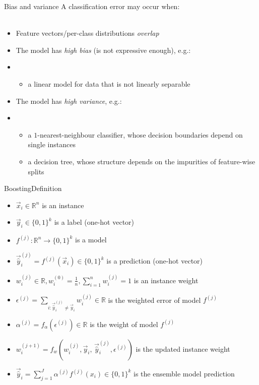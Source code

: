 \documentclass[10pt]{beamer}
\begin{document}
\begin{frame}{Bias and variance}
  A classification error may occur when:
  \\~\
  \begin{itemize}
    \item Feature vectors/per-class distributions \emph{overlap}
    \item The model has \emph{high bias} (is not expressive enough), e.g.:
    \item[]
          \begin{itemize}
            \item a linear model for data that is not linearly separable
          \end{itemize}
    \item The model has \emph{high variance}, e.g.:
    \item[]
          \begin{itemize}
            \item a $1$-nearest-neighbour classifier, whose decision boundaries
                  depend on single instances
            \item a decision tree, whose structure depends on the impurities of
                  feature-wise splits
          \end{itemize}
  \end{itemize}
\end{frame}

\begin{frame}{Boosting}{Definition}
  \begin{itemize}
    \item $\vec{x}_i \in \mathbb{R}^n$ is an instance
    \item $\vec{y}_i \in \{0,1\}^k$ is a label (one-hot vector)
    \item $f^{(j)} : \mathbb{R}^n \to \{0,1\}^k$ is a model
    \item $\vec{\hat{y}}_i^{(j)} = f^{(j)}(\vec{x}_i) \in \{0,1\}^k$ is a prediction (one-hot vector)
    \item $w_i^{(j)} \in \mathbb{R}, w_i^{(0)} = \frac{1}{n}, \sum_{i = 1}^{n}w^{(j)}_i = 1$ is an instance weight
    \item $\epsilon^{(j)} = \sum_{i : \vec{\hat{y}}_i^{(j)} \neq \vec{y}_i} w^{(j)}_i \in \mathbb{R}$ is the weighted error of model $f^{(j)}$
    \item $\alpha^{(j)} = f_\alpha(\epsilon^{(j)}) \in \mathbb{R}$ is the weight of model $f^{(j)}$
    \item $w^{(j+1)}_i = f_w(w^{(j)}_i, \vec{y}_i,\,\vec{\hat{y}}_i^{(j)}, \epsilon^{(j)})$ is the updated instance weight
    \item $\vec{\hat{y}}_i = \sum_{j = 1}^{J}\alpha^{(j)}f^{(j)}(x_i) \in \{0,1\}^k$ is the ensemble model prediction
  \end{itemize}
\end{frame}
\end{document}
